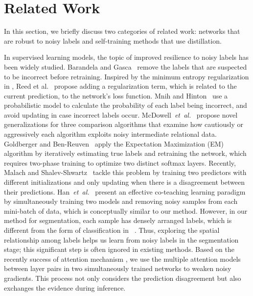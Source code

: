\documentclass[letterpaper]{article} %
\begin{document}
\section{Related Work}\label{sec:related}

In this section, we briefly discuss two categories of related work: networks that are robust to noisy labels and self-training methods that use distillation.

In supervised learning models, the topic of improved resilience to noisy labels has been widely studied. 
Barandela and Gasca~ remove the labels that are suspected to be incorrect before retraining.
Inspired by the minimum entropy regularization in \cite{Grandvalet2005}, Reed et al.~ propose adding a regularization term, which is related to the current prediction, to the network's loss function.
Mnih and Hinton~ use a probabilistic model to calculate the probability of each label being incorrect, and avoid updating in case incorrect labels occur.
McDowell~\emph{et~al.}~ propose novel generalizations for three comparison algorithms that examine how cautiously or aggressively each algorithm exploits noisy intermediate relational data.
Goldberger and Ben-Reuven~ apply the Expectation Maximization (EM) algorithm by iteratively estimating true labels and retraining the network, which requires two-phase training to optimize two distinct softmax layers.
Recently, Malach and Shalev-Shwartz~ tackle this problem by training two predictors with different initializations and only updating when there is a disagreement between their predictions.
Han~\emph{et~al.}~ present an effective co-teaching learning paradigm by simultaneously training two models and removing noisy samples from each mini-batch of data, which is conceptually similar to our method.
However, in our method for segmentation, each sample has densely arranged labels, which is different from the form of classification in ~\cite{Han2018}.
Thus, exploring the spatial relationship among labels helps us learn from noisy labels in the segmentation stage; this significant step is often ignored in existing methods.
Based on the recently success of attention mechanism \cite{he2018twofold,DBLP:conf/bmvc/YueMWZZ018,8237486,chen2018temporal}, we use the multiple attention models between layer pairs in two simultaneously trained networks to weaken noisy gradients. This process not only considers the prediction disagreement but also exchanges the evidence during inference.
\end{document}
